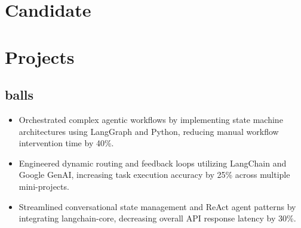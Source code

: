 \documentclass[11pt]{article}
\begin{document}
\section*{Candidate}

\section*{Projects}

\subsection*{balls}
\begin{itemize}
    \item Orchestrated complex agentic workflows by implementing state machine architectures using LangGraph and Python, reducing manual workflow intervention time by 40\%.
    \item Engineered dynamic routing and feedback loops utilizing LangChain and Google GenAI, increasing task execution accuracy by 25\% across multiple mini-projects.
    \item Streamlined conversational state management and ReAct agent patterns by integrating langchain-core, decreasing overall API response latency by 30\%.
\end{itemize}
\end{document}
